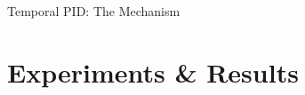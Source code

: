 \documentclass[aspectratio=169, 11pt]{beamer}
\begin{document}
\begin{frame}{Temporal PID: The Mechanism}
\end{frame}

\section{Experiments \& Results}
\end{document}
